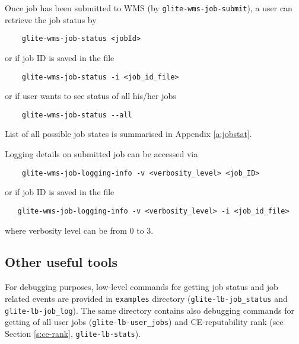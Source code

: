 Once job has been submitted to WMS (by \verb'glite-wms-job-submit'), 
a user can retrieve the job status by
\begin{verbatim}
    glite-wms-job-status <jobId>
\end{verbatim}
or if job ID is saved in the file
\begin{verbatim}
    glite-wms-job-status -i <job_id_file>
\end{verbatim}
or if user wants to see status of all his/her jobs
\begin{verbatim}
    glite-wms-job-status --all
\end{verbatim}
List of all possible job states is summarised in Appendix \ref{a:jobstat}.

Logging details on submitted job can be accessed via
\begin{verbatim}
    glite-wms-job-logging-info -v <verbosity_level> <job_ID>
\end{verbatim}
or if job ID is saved in the file
\begin{verbatim}
   glite-wms-job-logging-info -v <verbosity_level> -i <job_id_file>
\end{verbatim}
where verbosity level can be from 0 to 3. 







\subsection{Other useful tools}

For debugging purposes, low-level commands for getting \LB job status and job related events are provided in 
\verb'examples' directory (\verb'glite-lb-job_status' and \verb'glite-lb-job_log'). The same directory
contains also debugging commands for getting of all user jobs (\verb'glite-lb-user_jobs') and
CE-reputability rank (see Section \ref{s:ce-rank}, \verb'glite-lb-stats').

